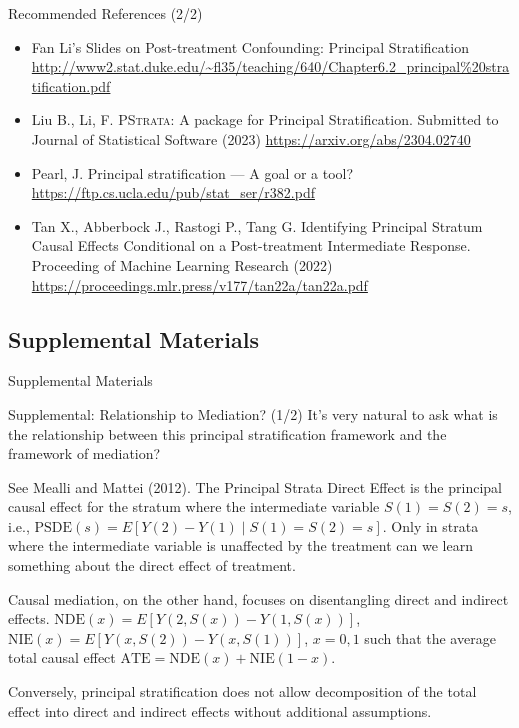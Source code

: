 \documentclass[10pt]{beamer}
\begin{document}
\begin{frame}{Recommended References \hfill {\small (2/2)}}
\footnotesize 
\begin{itemize}
    \item Fan Li's Slides on Post-treatment Confounding: Principal Stratification {\tiny \url{http://www2.stat.duke.edu/\~fl35/teaching/640/Chapter6.2_principal\%20stratification.pdf}}

    \item Liu B., Li, F. \textsc{PStrata}: A package for Principal Stratification. Submitted to Journal of Statistical Software (2023) {\tiny \url{https://arxiv.org/abs/2304.02740}}

    \item Pearl, J. Principal stratification — A goal or a tool? {\tiny \url{https://ftp.cs.ucla.edu/pub/stat_ser/r382.pdf}}

    \item Tan X., Abberbock J., Rastogi P., Tang G. Identifying Principal Stratum Causal Effects Conditional on a Post-treatment 
    Intermediate Response. Proceeding of Machine Learning Research (2022) {\tiny \url{https://proceedings.mlr.press/v177/tan22a/tan22a.pdf}}

\end{itemize}
\normalsize
\end{frame}

\subsection*{Supplemental Materials}

\begin{frame}
Supplemental Materials
\end{frame}

\begin{frame}{Supplemental: Relationship to Mediation? \hfill {\small (1/2)}}
It's very natural to ask what is the relationship between 
this principal stratification framework and the framework of mediation?

{\small
See Mealli and Mattei (2012). The Principal Strata Direct Effect 
is the principal causal effect for the stratum where the intermediate 
variable $S(1) = S(2) = s$, i.e., $\mathrm{PSDE}(s) = E[Y(2) - Y(1) \mid S(1) = S(2) = s]$. 
Only in strata where the intermediate variable is unaffected by the treatment 
can we learn something about the direct effect of treatment. 

Causal mediation, on the other hand, focuses on disentangling 
direct and indirect effects. $\mathrm{NDE}(x) = E[Y(2, S(x)) - Y(1, S(x))]$, 
$\mathrm{NIE}(x) = E[Y(x, S(2)) - Y(x, S(1))]$, $x = 0, 1$ such that 
the average total causal effect $\mathrm{ATE} = \mathrm{NDE}(x) + \mathrm{NIE}(1-x)$. 

Conversely, principal stratification does not allow 
decomposition of the total effect into direct and indirect 
effects without additional assumptions.
}
\end{frame}
\end{document}

